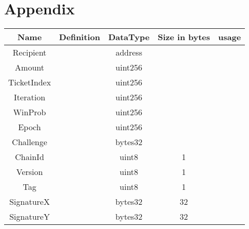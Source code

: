 \section{Appendix}
\vspace{1cm}
    \begin{tabular}{ c | c | c | c | c}
    Name & Definition & DataType & Size in bytes & usage\\ \hline
    Recipient & &address &  & \\  
    Amount & &uint256 & &  \\
    TicketIndex & &uint256 &  & \\
    Iteration & &uint256 &  & \\
    WinProb & &uint256 &  & \\
    Epoch & &uint256 &  & \\
    Challenge & &bytes32 &  & \\
    ChainId & &uint8 & 1 & \\
    Version & &uint8 & 1 & \\
    Tag & &uint8 & 1 & \\
    SignatureX & &bytes32 & 32 & \\
    SignatureY & &bytes32 & 32 & 
    \end{tabular}


